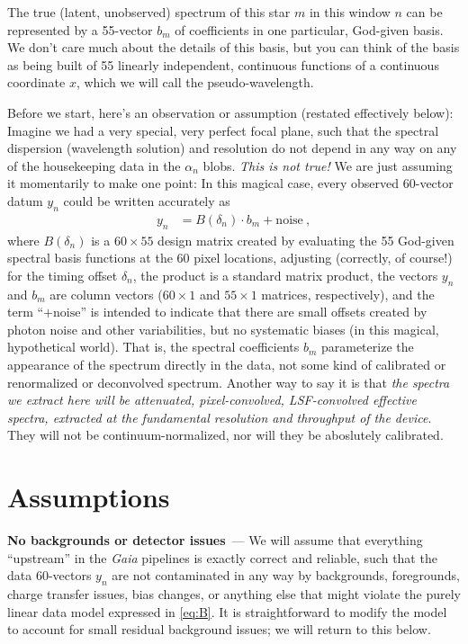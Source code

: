 \documentclass[11pt]{article}
\renewcommand{\paragraph}[1]{\medskip\par\noindent\textbf{#1}~---}
\begin{document}
The true (latent, unobserved) spectrum of this star $m$ in this window $n$ can be represented by a 55-vector $b_m$ of coefficients in one particular, God-given basis.
We don't care much about the details of this basis, but you can think of the basis as being built of 55 linearly independent, continuous functions of a continuous coordinate $x$, which we will call the pseudo-wavelength.

Before we start, here's an observation or assumption (restated effectively below):
Imagine we had a very special, very perfect focal plane, such that the spectral dispersion (wavelength solution) and resolution do not depend in any way on any of the housekeeping data in the $\alpha_n$ blobs.
\emph{This is not true!} We are just assuming it momentarily to make one point:
In this magical case, every observed 60-vector datum $y_n$ could be written accurately as
\begin{align}
    y_n &= B(\delta_n)\cdot b_m + \mbox{noise} ~,\label{eq:B}
\end{align}
where $B(\delta_n)$ is a $60\times 55$ design matrix created by evaluating the 55 God-given spectral basis functions at the 60 pixel locations, adjusting (correctly, of course!) for the timing offset $\delta_n$,
the product is a standard matrix product,
the vectors $y_n$ and $b_m$ are column vectors ($60\times 1$ and $55\times 1$ matrices, respectively),
and the term ``$+\mbox{noise}$'' is intended to indicate that there are small offsets created by photon noise and other variabilities, but no systematic biases (in this magical, hypothetical world).
That is, the spectral coefficients $b_m$ parameterize the appearance of the spectrum directly in the data, not some kind of calibrated or renormalized or deconvolved spectrum.
Another way to say it is that \emph{the spectra we extract here will be attenuated, pixel-convolved, LSF-convolved effective spectra, extracted at the fundamental resolution and throughput of the device}.
They will not be continuum-normalized, nor will they be aboslutely calibrated.

\section{Assumptions}

\paragraph{No backgrounds or detector issues}
We will assume that everything ``upstream'' in the \textsl{Gaia} pipelines is exactly correct and reliable, such that the data 60-vectors $y_n$ are not contaminated in any way by backgrounds, foregrounds, charge transfer issues, bias changes, or anything else that might violate the purely linear data model expressed in \eqref{eq:B}.
It is straightforward to modify the model to account for small residual background issues; we will return to this below.
\end{document}
